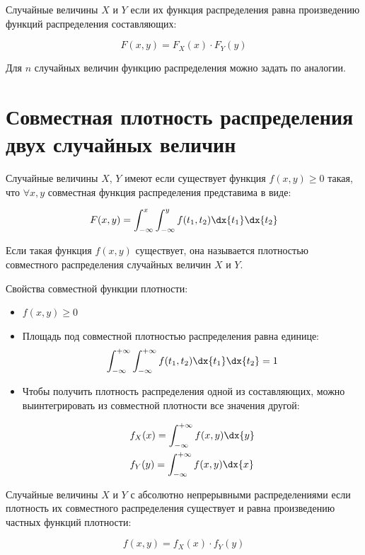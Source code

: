 \documentclass[12pt, a4paper, oneside]{article}
\begin{document}
Случайные величины $X$ и $Y$  если их функция распределения равна произведению функций распределения составляющих:

$$
F(x,y) = F_{X}(x) \cdot F_{Y}(y)  
$$

Для $n$ случайных величин функцию распределения можно задать по аналогии. 

\section{Совместная плотность распределения двух случайных величин}

Случайные величины $X$, $Y$ имеют  если существует функция $f(x, y) \ge 0$ такая, что $\forall x,y$ совместная функция распределения представима в виде: 

$$
F(x,y) = \int_{-\infty}^x \int_{-\infty}^y f(t_1, t_2) \dx{t_1}\dx{t_2}
$$

Если такая функция $f(x, y)$ существует, она называется плотностью совместного распределения случайных величин $X$ и $Y$.

Свойства совместной функции плотности:

\begin{itemize}
\item  $f(x,y) \ge 0$
\item  Площадь под совместной плотностью распределения равна единице: 
$$
\int_{-\infty}^{+\infty} \int_{-\infty}^{+\infty}  f(t_1, t_2) \dx{t_1}\dx{t_2} = 1
$$
\item Чтобы получить плотность распределения одной из составляющих, можно выинтегрировать из совместной плотности все значения другой:

\begin{equation*}
\begin{aligned}
& f_X(x) = \int_{-\infty}^{+\infty} f(x,y) \dx{y} \\ 
& f_Y(y) = \int_{-\infty}^{+\infty} f(x,y) \dx{x} \\ 
\end{aligned}
\end{equation*}
\end{itemize}

Случайные величины $X$ и $Y$ с абсолютно непрерывными распределениями  если плотность их совместного распределения существует и равна
произведению частных функций плотности:

$$
f(x,y) = f_X(x) \cdot f_Y(y)
$$
\end{document}
